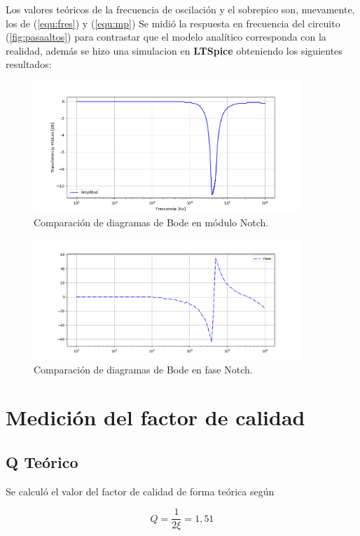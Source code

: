 Los valores teóricos de la frecuencia de oscilación y el sobrepico son, nuevamente, los de (\ref{equ:fres}) y (\ref{equ:mp})
Se midió la respuesta en frecuencia del circuito (\ref{fig:pasaaltos}) para contrastar que el modelo analítico corresponda con la realidad, además se hizo una simulacion en \textbf{LTSpice} obteniendo los siguientes resultados:
\begin{figure}[H]
	\centering
	\includegraphics[width=0.9\textwidth]{Bodes_Labo/Fotos/BR.png}
\caption{Comparación de diagramas de Bode en módulo Notch.}
	\label{fig:BODEBR}
\end{figure}

\begin{figure}[H]
	\centering
	\includegraphics[width=0.9\textwidth]{Bodes_Labo/Fotos/BRP.png}
\caption{Comparación de diagramas de Bode en fase Notch.}
	\label{fig:BODEBRP}
\end{figure}
\section{Medición del factor de calidad}
\subsection{Q Teórico}
Se calculó el valor del factor de calidad de forma teórica según 

\begin{equation}
    Q=\frac{1}{2\xi}=1,51
\end{equation}

